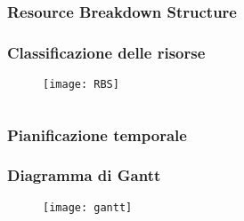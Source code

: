 \documentclass[compress,9pt]{beamer}
\begin{document}
\subsubsection{Resource Breakdown Structure}
\begin{frame} %
\frametitle{Classificazione delle risorse}

\begin{figure}
  \texttt{[image: RBS]}
\end{figure}

\hspace{7em}

\begin{columns}
\end{columns}
\end{frame}

\subsubsection{Pianificazione temporale}
\begin{frame}%
\frametitle{Diagramma di Gantt}

\begin{figure}
  \texttt{[image: gantt]}
\end{figure}

\begin{columns}
\end{columns}
\end{frame}
\end{document}

